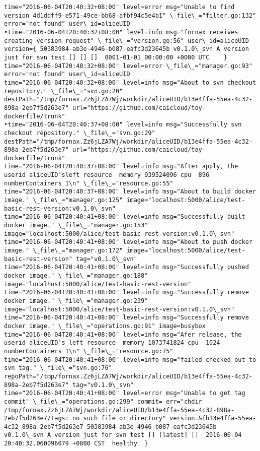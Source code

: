 \begin{lstlisting}[caption={Fornax功能性测试日志}]
time="2016-06-04T20:40:32+08:00" level=error msg="Unable to find version 4d1ddff9-e571-49ce-bb68-afbf94c5e4b1" \_file\_="filter.go:132" error="not found" user\_id=aliceUID 
•time="2016-06-04T20:40:32+08:00" level=info msg="fornax receives creating version request" \_file\_="version.go:56" user\_id=aliceUID version={ 50383984-ab3e-4946-b087-eafc3d23645b v0.1.0\_svn A version just for svn test [] [] []  0001-01-01 00:00:00 +0000 UTC    } 
time="2016-06-04T20:40:32+08:00" level=error \_file\_="manager.go:93" error="not found" user\_id=aliceUID 
time="2016-06-04T20:40:32+08:00" level=info msg="About to svn checkout repository." \_file\_="svn.go:20" destPath="/tmp/fornax.Zz6jLZA7Wj/workdir/aliceUID/b13e4ffa-55ea-4c32-898a-2eb7f5d263e7" url="https://github.com/caicloud/toy-dockerfile/trunk" 
•time="2016-06-04T20:40:37+08:00" level=info msg="Successfully svn checkout repository." \_file\_="svn.go:29" destPath="/tmp/fornax.Zz6jLZA7Wj/workdir/aliceUID/b13e4ffa-55ea-4c32-898a-2eb7f5d263e7" url="https://github.com/caicloud/toy-dockerfile/trunk" 
time="2016-06-04T20:40:37+08:00" level=info msg="After apply, the userid aliceUID'sleft resource  memory 939524096 cpu  896 numberContainers 1\n" \_file\_="resource.go:55" 
time="2016-06-04T20:40:37+08:00" level=info msg="About to build docker image." \_file\_="manager.go:125" image="localhost:5000/alice/test-basic-rest-version:v0.1.0\_svn" 
time="2016-06-04T20:40:41+08:00" level=info msg="Successfully built docker image." \_file\_="manager.go:153" image="localhost:5000/alice/test-basic-rest-version:v0.1.0\_svn" 
time="2016-06-04T20:40:41+08:00" level=info msg="About to push docker image." \_file\_="manager.go:172" image="localhost:5000/alice/test-basic-rest-version" tag="v0.1.0\_svn" 
time="2016-06-04T20:40:41+08:00" level=info msg="Successfully pushed docker image." \_file\_="manager.go:188" image="localhost:5000/alice/test-basic-rest-version" 
time="2016-06-04T20:40:41+08:00" level=info msg="Successfully remove docker image." \_file\_="manager.go:239" image="localhost:5000/alice/test-basic-rest-version:v0.1.0\_svn" 
time="2016-06-04T20:40:41+08:00" level=info msg="Successfully remove docker image." \_file\_="operations.go:91" image=busybox 
time="2016-06-04T20:40:41+08:00" level=info msg="Afer release, the userid aliceUID's left resource  memory 1073741824 cpu  1024 numberContainers 1\n" \_file\_="resource.go:75" 
time="2016-06-04T20:40:41+08:00" level=info msg="failed checked out to svn tag." \_file\_="svn.go:76" repoPath="/tmp/fornax.Zz6jLZA7Wj/workdir/aliceUID/b13e4ffa-55ea-4c32-898a-2eb7f5d263e7" tag="v0.1.0\_svn" 
time="2016-06-04T20:40:41+08:00" level=error msg="Unable to get tag commit" \_file\_="operations.go:299" commit= err="chdir /tmp/fornax.Zz6jLZA7Wj/workdir/aliceUID/b13e4ffa-55ea-4c32-898a-2eb7f5d263e7/tags: no such file or directory" version=&{b13e4ffa-55ea-4c32-898a-2eb7f5d263e7 50383984-ab3e-4946-b087-eafc3d23645b v0.1.0\_svn A version just for svn test [] [latest] []  2016-06-04 20:40:32.060096079 +0800 CST  healthy  } 

\end{lstlisting}
